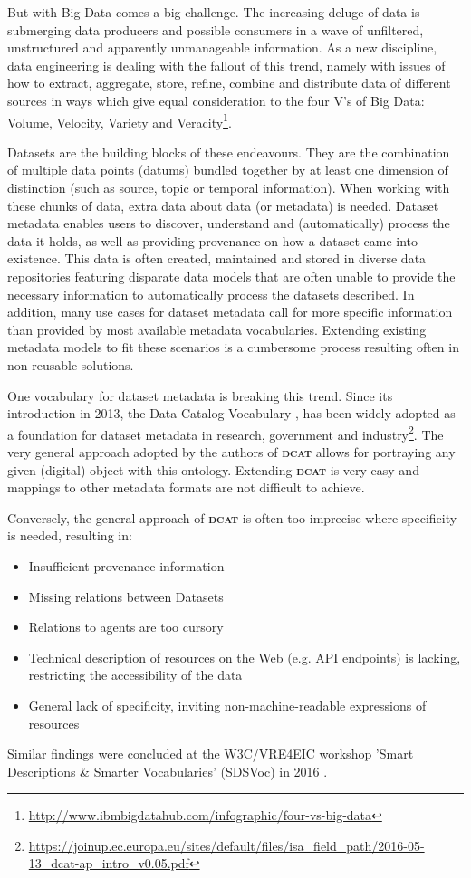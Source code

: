 \documentclass[a4paper,english,twoside,BCOR1.5cm,headsepline,DIV12,appendixprefix,final,12pt]{scrbook}
\newcommand{\dcat}{{\scshape\bfseries dcat}\xspace}
\newcommand\footnoteurl[1]{\footnote{\scriptsize\url{#1}}}
\begin{document}
But with Big Data comes a big challenge. The increasing deluge of data is submerging data producers and possible consumers in a wave of unfiltered, unstructured and apparently unmanageable information. As a new discipline, data engineering is dealing with the fallout of this trend, namely with issues of how to extract, aggregate, store, refine, combine and distribute data of different sources in ways which give equal consideration to the four V's of Big Data: Volume, Velocity, Variety and Veracity\footnoteurl{http://www.ibmbigdatahub.com/infographic/four-vs-big-data}. 

Datasets are the building blocks of these endeavours. They are the combination of multiple data points (datums) bundled together by at least one dimension of distinction (such as source, topic or temporal information). When working with these chunks of data, extra data about data (or metadata) is needed. Dataset metadata enables users to discover, understand and (automatically) process the data it holds, as well as providing provenance on how a dataset came into existence. 
This data is often created, maintained and stored in diverse data repositories featuring disparate data models that are often unable to provide the necessary information to automatically process the datasets described. In addition, many use cases for dataset metadata call for more specific information than provided by most available metadata vocabularies. Extending existing metadata models to fit these scenarios is a cumbersome process resulting often in non-reusable solutions. 

One vocabulary for dataset metadata is breaking this trend. 
Since its introduction in 2013, the Data Catalog Vocabulary \cite{ddcat}, has been widely adopted as a foundation for dataset metadata in research, government and industry\footnoteurl{https://joinup.ec.europa.eu/sites/default/files/isa_field_path/2016-05-13_dcat-ap_intro_v0.05.pdf}. The very general approach adopted by the authors of \dcat allows for portraying any given (digital) object with this ontology. Extending \dcat is very easy and mappings to other metadata formats are not difficult to achieve. 

Conversely, the general approach of \dcat is often too imprecise where specificity is needed, resulting in:

\begin{itemize}
\item Insufficient provenance information
\item Missing relations between Datasets
\item Relations to agents are too cursory
\item Technical description of resources on the Web (e.g. API endpoints) is lacking, restricting the accessibility of the data
\item General lack of specificity, inviting non-machine-readable expressions of resources
\end{itemize}
Similar findings were concluded at the W3C/VRE4EIC workshop 'Smart Descriptions \& Smarter Vocabularies' (SDSVoc) in 2016 \cite{sdsvocW3C2016}. 
\end{document}
